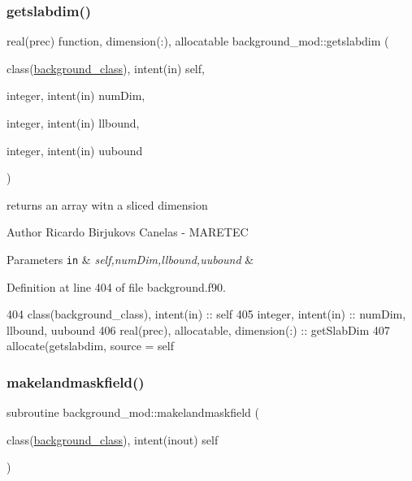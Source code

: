 \subsubsection{\texorpdfstring{getslabdim()}{getslabdim()}}
{\footnotesize\ttfamily real(prec) function, dimension(\+:), allocatable background\+\_\+mod\+::getslabdim (\begin{DoxyParamCaption}\item[{class(\mbox{\hyperlink{structbackground__mod_1_1background__class}{background\+\_\+class}}), intent(in)}]{self,  }\item[{integer, intent(in)}]{num\+Dim,  }\item[{integer, intent(in)}]{llbound,  }\item[{integer, intent(in)}]{uubound }\end{DoxyParamCaption})\hspace{0.3cm}{\ttfamily [private]}}



returns an array witn a sliced dimension 

\begin{DoxyAuthor}{Author}
Ricardo Birjukovs Canelas -\/ M\+A\+R\+E\+T\+EC 
\end{DoxyAuthor}

\begin{DoxyParams}[1]{Parameters}
\mbox{\tt in}  & {\em self,num\+Dim,llbound,uubound} & \\
\hline
\end{DoxyParams}


Definition at line 404 of file background.\+f90.


\begin{DoxyCode}
404     \textcolor{keywordtype}{class}(background\_class), \textcolor{keywordtype}{intent(in)} :: self
405     \textcolor{keywordtype}{integer}, \textcolor{keywordtype}{intent(in)} :: numDim, llbound, uubound
406     \textcolor{keywordtype}{real(prec)}, \textcolor{keywordtype}{allocatable}, \textcolor{keywordtype}{dimension(:)} :: getSlabDim
407     \textcolor{keyword}{allocate}(getslabdim, source = self%
\end{DoxyCode}
\mbox{\label{namespacebackground__mod_a26fbde130644e684871804b73de8d51b}} 
\subsubsection{\texorpdfstring{makelandmaskfield()}{makelandmaskfield()}}
{\footnotesize\ttfamily subroutine background\+\_\+mod\+::makelandmaskfield (\begin{DoxyParamCaption}\item[{class(\mbox{\hyperlink{structbackground__mod_1_1background__class}{background\+\_\+class}}), intent(inout)}]{self }\end{DoxyParamCaption})\hspace{0.3cm}{\ttfamily [private]}}



